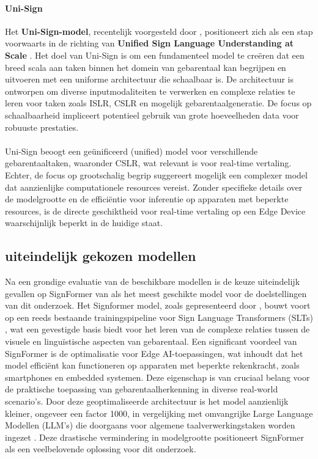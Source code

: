 \paragraph{Uni-Sign}
Het \textbf{Uni-Sign-model}, recentelijk voorgesteld door \textcite{li2025uni}, positioneert zich als een stap voorwaarts in de richting van \textbf{Unified Sign Language Understanding at Scale} \citep{li2025uni}. Het doel van Uni-Sign is om een fundamenteel model te creëren dat een breed scala aan taken binnen het domein van gebarentaal kan begrijpen en uitvoeren met een uniforme architectuur die schaalbaar is. De architectuur is ontworpen om diverse inputmodaliteiten te verwerken en complexe relaties te leren voor taken zoals ISLR, CSLR en mogelijk gebarentaalgeneratie. De focus op schaalbaarheid impliceert potentieel gebruik van grote hoeveelheden data voor robuuste prestaties.
\\
\\
Uni-Sign beoogt een ge\"{u}nificeerd (unified) model voor verschillende gebarentaaltaken, waaronder CSLR, wat relevant is voor real-time vertaling. Echter, de focus op grootschalig begrip suggereert mogelijk een complexer model dat aanzienlijke computationele resources vereist. Zonder specifieke details over de modelgrootte en de efficiëntie voor inferentie op apparaten met beperkte resources, is de directe geschiktheid voor real-time vertaling op een Edge Device waarschijnlijk beperkt in de huidige staat.

\subsection{uiteindelijk gekozen modellen}
Na een grondige evaluatie van de beschikbare modellen is de keuze uiteindelijk gevallen op SignFormer van \textcite{eta2024signformer} als het meest geschikte model voor de doelstellingen van dit onderzoek. 
Het Signformer model, zoals gepresenteerd door \textcite{eta2024signformer}, bouwt voort op een reeds bestaande trainingspipeline voor Sign Language Transformers (SLTs) \autocite{SLTS}, wat een gevestigde basis biedt voor het leren van de complexe relaties tussen de visuele en linguïstische aspecten van gebarentaal. 
Een significant voordeel van SignFormer is de optimalisatie voor Edge AI-toepassingen, wat inhoudt dat het model efficiënt kan functioneren op apparaten met beperkte rekenkracht, zoals smartphones en embedded systemen. 
Deze eigenschap is van cruciaal belang voor de praktische toepassing van gebarentaalherkenning in diverse real-world scenario's. 
Door deze geoptimaliseerde architectuur is het model aanzienlijk kleiner, ongeveer een factor 1000, in vergelijking met omvangrijke Large Language Modellen (LLM's) die doorgaans voor algemene taalverwerkingstaken worden ingezet \autocite{gong2024llmsgoodsignlanguage}. 
Deze drastische vermindering in modelgrootte positioneert SignFormer als een veelbelovende oplossing voor dit onderzoek.

